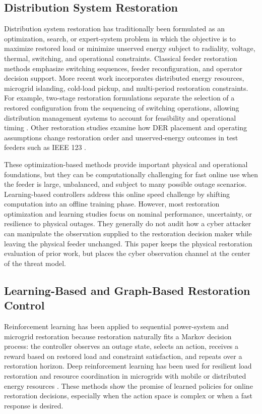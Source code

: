 \subsection{Distribution System Restoration}

Distribution system restoration has traditionally been formulated as an optimization, search, or expert-system problem in which the objective is to maximize restored load or minimize unserved energy subject to radiality, voltage, thermal, switching, and operational constraints. Classical feeder restoration methods emphasize switching sequences, feeder reconfiguration, and operator decision support. More recent work incorporates distributed energy resources, microgrid islanding, cold-load pickup, and multi-period restoration constraints. For example, two-stage restoration formulations separate the selection of a restored configuration from the sequencing of switching operations, allowing distribution management systems to account for feasibility and operational timing \cite{poudel2020twoStage}. Other restoration studies examine how DER placement and operating assumptions change restoration order and unserved-energy outcomes in test feeders such as IEEE 123 \cite{rhodes2021derRestoration}.

These optimization-based methods provide important physical and operational foundations, but they can be computationally challenging for fast online use when the feeder is large, unbalanced, and subject to many possible outage scenarios. Learning-based controllers address this online speed challenge by shifting computation into an offline training phase. However, most restoration optimization and learning studies focus on nominal performance, uncertainty, or resilience to physical outages. They generally do not audit how a cyber attacker can manipulate the observation supplied to the restoration decision maker while leaving the physical feeder unchanged. This paper keeps the physical restoration evaluation of prior work, but places the cyber observation channel at the center of the threat model.

\subsection{Learning-Based and Graph-Based Restoration Control}

Reinforcement learning has been applied to sequential power-system and microgrid restoration because restoration naturally fits a Markov decision process: the controller observes an outage state, selects an action, receives a reward based on restored load and constraint satisfaction, and repeats over a restoration horizon. Deep reinforcement learning has been used for resilient load restoration and resource coordination in microgrids with mobile or distributed energy resources \cite{yao2019drlRestoration}. These methods show the promise of learned policies for online restoration decisions, especially when the action space is complex or when a fast response is desired.


